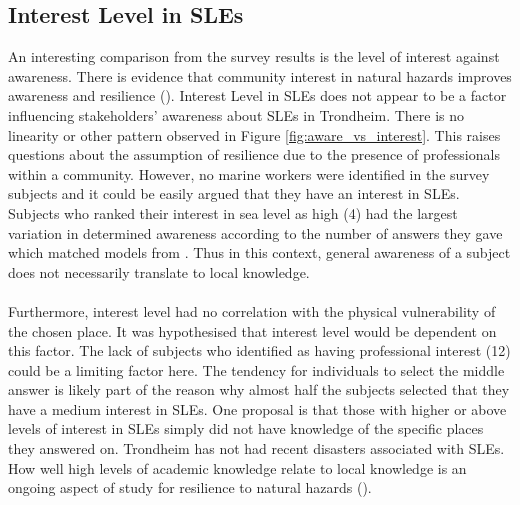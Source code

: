 \subsection{Interest Level in SLEs}
 An interesting comparison from the survey results is the level of interest against awareness. There is evidence that community interest in natural hazards improves awareness and resilience (\cite{cutter_community_2020}). Interest Level in SLEs does not appear to be a factor influencing stakeholders' awareness about SLEs in Trondheim. There is no linearity or other pattern observed in Figure \ref{fig:aware_vs_interest}. This raises questions about the assumption of resilience due to the presence of professionals within a community. However, no marine workers were identified in the survey subjects and it could be easily argued that they have an interest in SLEs. Subjects who ranked their interest in sea level as high (4) had the largest variation in determined awareness according to the number of answers they gave which matched models from \cite{kartverket_se_2020}. Thus in this context, general awareness of a subject does not necessarily translate to local knowledge.
\paragraph{}
Furthermore, interest level had no correlation with the physical vulnerability of the chosen place. It was hypothesised that interest level would be dependent on this factor. The lack of subjects who identified as having professional interest (12) could be a limiting factor here. The tendency for individuals to select the middle answer is likely part of the reason why almost half the subjects selected that they have a medium interest in SLEs. One proposal is that those with higher or above levels of interest in SLEs simply did not have knowledge of the specific places they answered on. Trondheim has not had recent disasters associated with SLEs. How well high levels of academic knowledge relate to local knowledge is an ongoing aspect of study for resilience to natural hazards (\cite{lujala_role_2020}).
\paragraph{}



   

